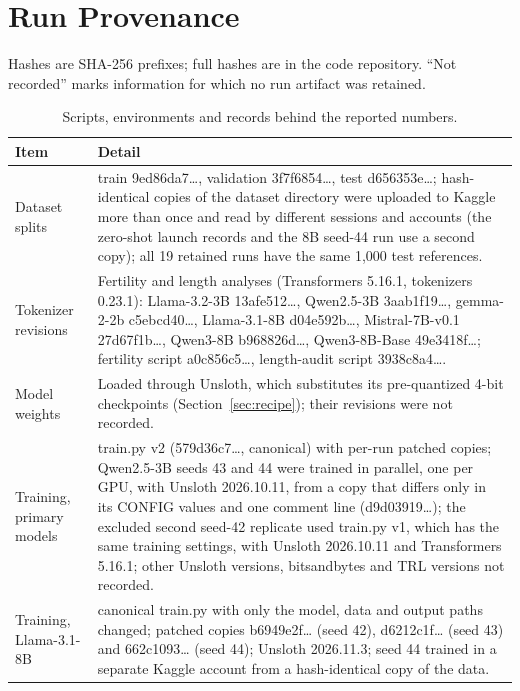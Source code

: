 \documentclass{article}
\begin{document}
\clearpage
\appendix

\section{Run Provenance}\label{app:prov}

Hashes are SHA-256 prefixes; full hashes are in the code repository. “Not recorded” marks information for which no run artifact was retained.

\begin{table}[H]
\centering
\fontsize{8.5}{10}\selectfont
\setlength{\tabcolsep}{3pt}
\caption{Scripts, environments and records behind the reported numbers.}\label{tab:prov}
\begin{tabular}{@{}L{123.2pt}L{334.5pt}@{}}
\toprule
\textbf{Item} & \textbf{Detail} \\
\midrule
Dataset splits & train 9ed86da7\ldots{}, validation 3f7f6854\ldots{}, test d656353e\ldots{}; hash-identical copies of the dataset directory were uploaded to Kaggle more than once and read by different sessions and accounts (the zero-shot launch records and the 8B seed-44 run use a second copy); all 19 retained runs have the same 1,000 test references. \\
Tokenizer revisions & Fertility and length analyses (Transformers 5.16.1, tokenizers 0.23.1): Llama-3.2-3B 13afe512\ldots{}, Qwen2.5-3B 3aab1f19\ldots{}, gemma-2-2b c5ebcd40\ldots{}, Llama-3.1-8B d04e592b\ldots{}, Mistral-7B-v0.1 27d67f1b\ldots{}, Qwen3-8B b968826d\ldots{}, Qwen3-8B-Base 49e3418f\ldots{}; fertility script a0c856c5\ldots{}, length-audit script 3938c8a4\ldots{}. \\
Model weights & Loaded through Unsloth, which substitutes its pre-quantized 4-bit checkpoints (Section~\ref{sec:recipe}); their revisions were not recorded. \\
Training, primary models & train.py v2 (579d36c7\ldots{}, canonical) with per-run patched copies; Qwen2.5-3B seeds 43 and 44 were trained in parallel, one per GPU, with Unsloth 2026.10.11, from a copy that differs only in its CONFIG values and one comment line (d9d03919\ldots{}); the excluded second seed-42 replicate used train.py v1, which has the same training settings, with Unsloth 2026.10.11 and Transformers 5.16.1; other Unsloth versions, bitsandbytes and TRL versions not recorded. \\
Training, Llama-3.1-8B & canonical train.py with only the model, data and output paths changed; patched copies b6949e2f\ldots{} (seed 42), d6212c1f\ldots{} (seed 43) and 662c1093\ldots{} (seed 44); Unsloth 2026.11.3; seed 44 trained in a separate Kaggle account from a hash-identical copy of the data. \\

\end{tabular}
\end{table}
\end{document}
